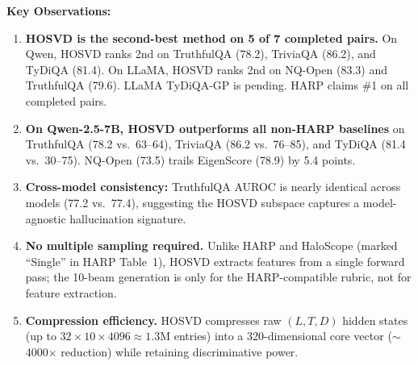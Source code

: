 \documentclass[11pt,a4paper]{article}
\begin{document}
\noindent
\textbf{Key Observations:}
\begin{enumerate}
  \item \textbf{HOSVD is the second-best method on 5 of 7 completed pairs.}
        On Qwen, HOSVD ranks 2nd on TruthfulQA (78.2), TriviaQA (86.2), and
        TyDiQA (81.4).  On LLaMA, HOSVD ranks 2nd on NQ-Open (83.3) and
        TruthfulQA (79.6).  LLaMA TyDiQA-GP is pending.  HARP claims \#1 on
        all completed pairs.

  \item \textbf{On Qwen-2.5-7B, HOSVD outperforms all non-HARP baselines}
        on TruthfulQA (78.2 vs.\ 63--64), TriviaQA (86.2 vs.\ 76--85),
        and TyDiQA (81.4 vs.\ 30--75).  NQ-Open (73.5) trails EigenScore
        (78.9) by 5.4 points.

  \item \textbf{Cross-model consistency:} TruthfulQA AUROC is nearly identical
        across models (77.2 vs.\ 77.4), suggesting the HOSVD subspace captures
        a model-agnostic hallucination signature.

  \item \textbf{No multiple sampling required.} Unlike HARP and HaloScope
        (marked ``Single'' in HARP Table~1), HOSVD extracts features from
        a single forward pass; the 10-beam generation is only for the
        HARP-compatible rubric, not for feature extraction.

  \item \textbf{Compression efficiency.} HOSVD compresses raw $(L, T, D)$
        hidden states (up to $32 \times 10 \times 4096 \approx 1.3$M entries)
        into a 320-dimensional core vector ($\sim$4000$\times$ reduction)
        while retaining discriminative power.
\end{enumerate}
\end{document}
